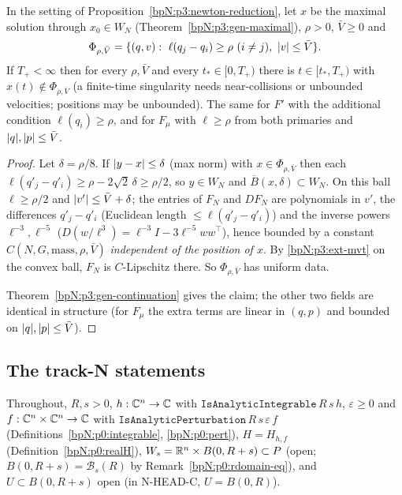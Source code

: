 \begin{corollary}\label{bpN:p3:newton-continuation}
In the setting of Proposition~\ref{bpN:p3:newton-reduction}, let $x$ be the maximal solution through $x_0\in W_N$
(Theorem~\ref{bpN:p3:gen-maximal}), $\rho>0$, $\bar V\ge0$ and
\[\Phi_{\rho,\bar V}=\{(q,v):\ \ell(q_j-q_i)\ge\rho\ (i\ne j),\ \abs v\le\bar V\}.\]
If $T_+<\infty$ then for every $\rho,\bar V$ and every $t_*\in[0,T_+)$ there is $t\in[t_*,T_+)$ with $x(t)\notin\Phi_{\rho,\bar V}$
(a finite-time singularity needs near-collisions or unbounded velocities; positions may be unbounded). The same for $F'$ with the additional condition $\ell(q_i)\ge\rho$, and for $F_\mu$ with $\ell\ge\rho$ from both primaries and $\lvert q\rvert,\lvert p\rvert\le\bar V$.
\end{corollary}
\begin{proof}
\label{stepN:p3:nc-data} Let $\delta=\rho/8$. If $\lvert y-x\rvert\le\delta$ (max norm) with $x\in\Phi_{\rho,\bar V}$ then each $\ell(q'_j-q'_i)\ge\rho-2\sqrt2\,\delta\ge\rho/2$, so $y\in W_N$ and $\overline B(x,\delta)\subset W_N$.
On this ball $\ell\ge\rho/2$ and $\lvert v'\rvert\le\bar V+\delta$; the entries of $F_N$ and $DF_N$ are polynomials in $v'$, the differences $q'_j-q'_i$ (Euclidean length $\le\ell(q'_j-q'_i)$) and the inverse powers $\ell^{-3},\ell^{-5}$ ($D(w/\ell^3)=\ell^{-3}I-3\ell^{-5}ww^{\top}$), hence bounded by a constant $C(N,G,\mathrm{mass},\rho,\bar V)$ \emph{independent of the position of $x$}. By \ref{bpN:p3:ext-mvt} on the convex ball, $F_N$ is $C$-Lipschitz there. So $\Phi_{\rho,\bar V}$ has uniform data.

\label{stepN:p3:nc-apply} Theorem~\ref{bpN:p3:gen-continuation} gives the claim; the other two fields are identical in structure (for $F_\mu$ the extra terms are linear in $(q,p)$ and bounded on $\lvert q\rvert,\lvert p\rvert\le\bar V$).
\end{proof}

\subsection{The track-N statements}\label{bpN:p3:s-N}

\begingroup\sloppy
Throughout, $R,s>0$, $h:\mathbb{C}^n\to\mathbb{C}$ with $\texttt{IsAnalyticIntegrable}\,R\,s\,h$, $\varepsilon\ge0$ and $f:\mathbb{C}^n\times\mathbb{C}^n\to\mathbb{C}$ with
$\texttt{IsAnalyticPerturbation}\,R\,s\,\varepsilon\,f$ (Definitions~\ref{bpN:p0:integrable}, \ref{bpN:p0:pert}), $H=H_{h,f}$
(Definition~\ref{bpN:p0:realH}), $W_s=\mathbb{R}^n\times B(0,R+s)\subset P$ (open; $B(0,R+s)=\mathcal B_s(R)$ by Remark~\ref{bpN:p0:rdomain-eq}), and
$U\subset B(0,R+s)$ open (in N-HEAD-C, $U=B(0,R)$).
\par\endgroup

